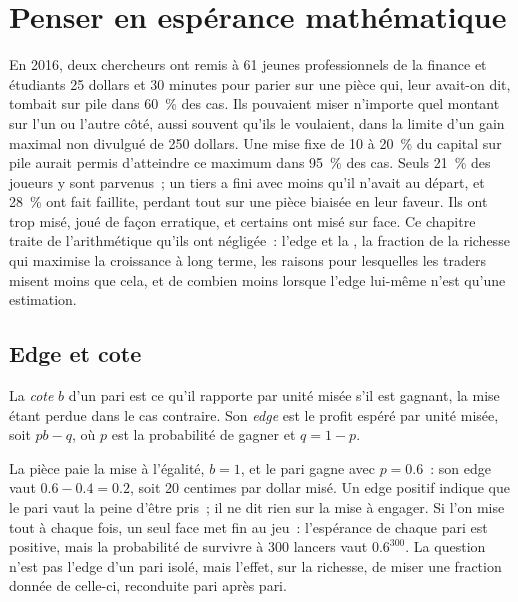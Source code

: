 \chapter{Penser en espérance mathématique}\label{ch:m2:thinking-in-expected-value}

En 2016, deux chercheurs ont remis à 61 jeunes professionnels de la finance et étudiants 25 dollars
et 30 minutes pour parier sur une pièce qui, leur avait-on dit, tombait sur pile dans 60~\% des cas. Ils
pouvaient miser n'importe quel montant sur l'un ou l'autre côté, aussi souvent qu'ils le voulaient, dans la
limite d'un gain maximal non divulgué de 250 dollars. Une mise fixe de 10 à 20~\% du capital sur pile
aurait permis d'atteindre ce maximum dans 95~\% des cas. Seuls 21~\% des joueurs y sont
parvenus~; un tiers a fini avec moins qu'il n'avait au départ, et 28~\% ont fait faillite, perdant
tout sur une pièce biaisée en leur faveur. Ils ont trop misé, joué de façon erratique, et certains ont misé sur face.
Ce chapitre traite de l'arithmétique qu'ils ont négligée~: l'edge et la , la fraction de la
richesse qui maximise la croissance à long terme, les raisons pour lesquelles les traders misent moins
que cela, et de combien moins lorsque l'edge lui-même n'est qu'une estimation.

\section{Edge et cote}

\begin{definition}\label{def:m2:thinking-in-expected-value:edge}
La \emph{cote} $b$ d'un pari est ce qu'il rapporte par unité misée s'il est gagnant,
la mise étant perdue dans le cas contraire. Son \emph{edge} est le profit espéré par
unité misée, soit $pb - q$, où $p$ est la probabilité de gagner et $q = 1 - p$.
\end{definition}

La pièce paie la mise à l'égalité, $b = 1$, et le pari gagne avec $p = 0.6$~: son edge vaut $0.6 - 0.4 = 0.2$,
soit 20 centimes par dollar misé. Un edge positif indique que le pari vaut la peine d'être pris~; il ne dit rien
sur la mise à engager. Si l'on mise tout à chaque fois, un seul face met fin au jeu~:
l'espérance de chaque pari est positive, mais la probabilité de survivre à 300 lancers
vaut $0.6^{300}$. La question n'est pas l'edge d'un pari isolé, mais l'effet, sur la richesse, de miser
une fraction donnée de celle-ci, reconduite pari après pari.


